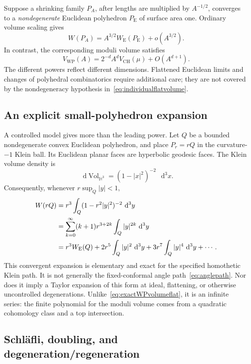 \documentclass[11pt,a4paper]{article}
\numberwithin{equation}{section}
\theoremstyle{definition}
\theoremstyle{remark}
\newcommand{\dd}{\mathop{}\!\mathrm d}
\newcommand{\WP}{\mathrm{WP}}
\newcommand{\HH}{\mathbb H}
\begin{document}
Suppose a shrinking family $P_A$, after lengths are multiplied by
$A^{-1/2}$, converges to a \emph{nondegenerate} Euclidean polyhedron
$P_{\mathrm E}$ of surface area one. Ordinary volume scaling gives
\begin{equation}
 W(P_A)=A^{3/2}W_{\mathrm E}(P_{\mathrm E})+o(A^{3/2}).
 \label{eq:individualflatvolume}
\end{equation}
In contrast, the corresponding moduli volume satisfies
\[
 V_{\WP}(A)=2^{-d}A^d V_{\mathrm{CH}}(\mu)+O(A^{d+1}).
\]
The different powers reflect different dimensions. Flattened
Euclidean limits and changes of polyhedral combinatorics require
additional care; they are not covered by the nondegeneracy
hypothesis in~\eqref{eq:individualflatvolume}.

\subsection{An explicit small-polyhedron expansion}

A controlled model gives more than the leading power. Let $Q$ be a
bounded nondegenerate convex Euclidean polyhedron, and place $P_r=rQ$ in
the curvature-$-1$ Klein ball. Its Euclidean planar faces are
hyperbolic geodesic faces. The Klein volume density is
\[
 \dd\operatorname{Vol}_{\HH^3}=(1-|x|^2)^{-2}\,\dd^3x.
\]
Consequently, whenever $r\sup_Q|y|<1$,
\begin{align}
 W(rQ)
 &=r^3\int_Q(1-r^2|y|^2)^{-2}\,\dd^3y\notag\\
 &=\sum_{k=0}^{\infty}(k+1)r^{3+2k}
                         \int_Q|y|^{2k}\,\dd^3y\notag\\
 &=r^3 W_{\mathrm E}(Q)
      +2r^5\int_Q|y|^2\,\dd^3y
      +3r^7\int_Q|y|^4\,\dd^3y+\cdots.
 \label{eq:Kleinvolumeexpansion}
\end{align}
This convergent expansion is elementary and exact for the specified
homothetic Klein path. It is not generally the fixed-conformal
angle path~\eqref{eq:anglepath}. Nor does it imply a Taylor expansion
of this form at ideal, flattening, or otherwise uncontrolled
degenerations. Unlike~\eqref{eq:exactWPvolumeflat}, it is an infinite
series: the finite polynomial for the moduli volume comes from a
quadratic cohomology class and a top intersection.

\subsection{Schl\"afli, doubling, and degeneration/regeneration}
\end{document}

